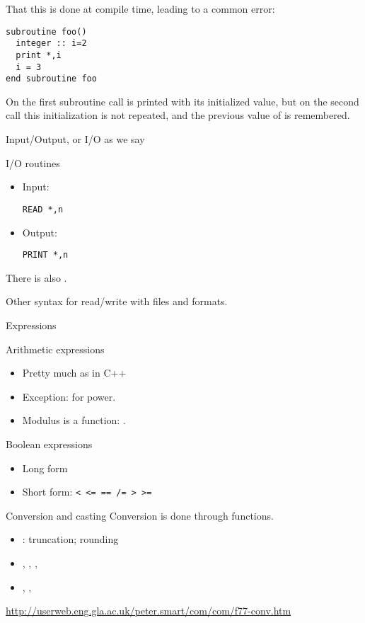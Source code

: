 That this is done at compile time, leading to a common error:
\begin{verbatim}
subroutine foo()
  integer :: i=2
  print *,i
  i = 3
end subroutine foo
\end{verbatim}
On the first subroutine call  is printed with its initialized
value, but on the second call this initialization is not repeated, and
the previous value of  is remembered.

 {Input/Output, or I/O as we say}
\label{sec:fio}

\begin{block}{I/O routines}
  \label{sl:frw}
  \begin{itemize}
  \item Input: 
\begin{verbatim}
READ *,n
\end{verbatim}
\item Output:
\begin{verbatim}
PRINT *,n
\end{verbatim}
  \end{itemize}
  There is also .

  Other syntax for read/write with files and formats.
\end{block}

 {Expressions}
\label{sec:fexpr}

\begin{block}{Arithmetic expressions}
  \label{sl:farith}
  \begin{itemize}
  \item Pretty much as in C++
  \item Exception:  for power.
  \item Modulus is a function: .
  \end{itemize}
\end{block}

\begin{block}{Boolean expressions}
  \label{sl:fbool}
  \begin{itemize}
  \item 
    Long form
  \item Short form:
    \verb+< <= == /= > >=+
  \end{itemize}
\end{block}

\begin{block}{Conversion and casting}
  Conversion is done through functions.
  \begin{itemize}
  \item {}: truncation;  rounding
  \item {}, , , 
  \item {}, , 
  \end{itemize}
\url{http://userweb.eng.gla.ac.uk/peter.smart/com/com/f77-conv.htm}
\end{block}


